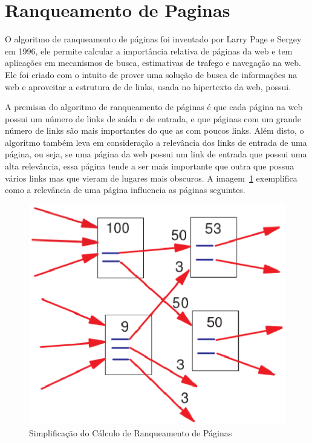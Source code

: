 \section{Ranqueamento de Paginas}
\label{ref:ran}
O algoritmo de ranqueamento de páginas foi inventado por Larry Page e Sergey em
1996, ele permite calcular a importância relativa de páginas da web e tem aplicações
em mecanismos de busca, estimativas de trafego e navegação na web. Ele foi criado
com o intuito de prover uma solução de busca de informações na web e aproveitar
a estrutura de de links, usada no hipertexto da web, possui\cite{pageRank}.

A premissa do algoritmo de ranqueamento de páginas é que cada página na web
possui um número de links de saída e de entrada, e que páginas com um grande
número de links são mais importantes do que as com poucos links. Além disto,
o algoritmo também leva em consideração a relevância dos links de entrada
de uma página, ou seja, se uma página da web possui um link de entrada que
possui uma alta relevância, essa página tende a ser mais importante que outra
que possua vários links mas que vieram de lugares mais obscuros. A imagem~\ref{fig:page_rank}
exemplifica como a relevância de uma página influencia as páginas seguintes.

\begin{figure}[h]
    \centering
        \includegraphics[keepaspectratio=true,scale=0.5]{figuras/page_rank.eps}
    \caption{Simplificação do Cálculo de Ranqueamento de Páginas}
    \label{fig:page_rank}
\end{figure}

